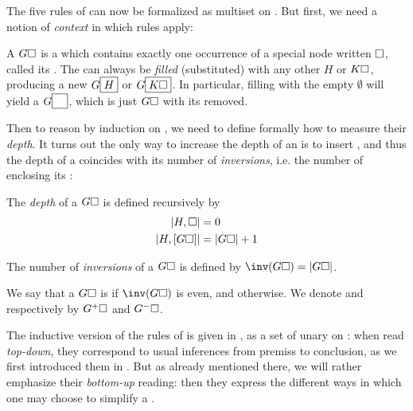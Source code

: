 \begin{scope}
\begin{scope}
The five rules of  can now be formalized as multiset 
on . But first, we need a notion of \emph{context} in which rules
apply:

\begin{definition}[Context]
  A  $G\square$ is a  which contains exactly one
  occurrence of a special node written $\square$, called its . The
   can always be \emph{filled} (substituted) with any other 
  $H$ or  $K\square$, producing a new  $G\fbox{$H$}$ or 
  $G\fbox{$K\square$}$. In particular, filling with the empty 
  $\emptyset$ will yield a  $G\fbox{$\phantom{G}$}$, which is just
  $G\square$ with its  removed.
\end{definition}

Then to reason by induction on , we need to define formally how to
measure their \emph{depth}. It turns out the only way to increase the depth of
an  is to insert \emph{}, and thus the depth of a
 coincides with its number of \emph{inversions}, i.e. the number of
 enclosing its :

\begin{definition}[Depth]
  The \emph{depth} of a  $G\square$ is defined recursively by
  \begin{align*}
    \left|H, \square\right| &= 0 \\
    \left|H, [G\square]\right| &= \left|G\square\right| + 1
  \end{align*}
\end{definition}

\begin{definition}[Inversions]

  The number of \emph{inversions} of a  $G\square$ is defined by
  $\inv(G\hole) = \gdepth{G\hole}$.
\end{definition}

\begin{definition}[Polarity]
  We say that a  $G\square$ is  if $\inv(G\hole)$ is
  even, and  otherwise. We denote  and  
  respectively by $G^+\square$ and $G^-\square$.
\end{definition}

The inductive version of the rules of  is given in , as
a set of unary  on : when read \emph{top-down},
they correspond to usual inferences from premiss to conclusion, as we first
introduced them in .
But as already mentioned there, we will rather emphasize their \emph{bottom-up}
reading: then they express the different ways in which one may choose to
simplify a .


\end{scope}
\end{scope}
